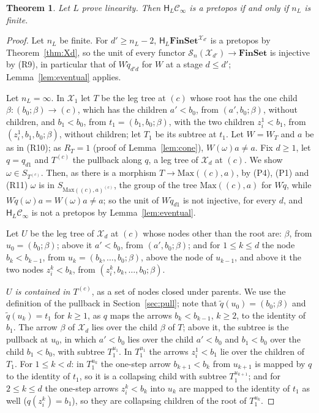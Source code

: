 \documentclass[11pt]{amsart}
\newtheorem{thm}{Theorem}[section]
\theoremstyle{definition}
\newcommand{\Fin}{\mathbf{FinSet}}
\newcommand{\Max}{\mathrm{Max}}
\newcommand{\HH}{\mathsf H}
\newcommand{\cX}{\mathcal X}
\newcommand{\cC}{\mathcal C}
\newcommand{\cS}{\mathcal S}
\begin{document}
\begin{thm}\label{thm:tower}
Let $L$ prove linearity. Then $\HH_L\cC_\infty$ is a pretopos if and
only if $n_L$ is finite.
\end{thm}
\begin{proof}
Let $n_L$ be finite. For $d'\ge n_L-2$, $\HH_L\Fin^{\cX_{d'}}$ is a
pretopos by Theorem~\ref{thm:Xd}, so the unit of every functor
$\cS_n(\cX_{d'})\to\Fin$ is injective by (R9), in particular that of
$W\tilde q_{d'd}$ for $W$ at a stage $d\le d'$;
Lemma~\ref{lem:eventual} applies.

Let $n_L=\infty$. In $\cX_1$ let $T$ be the leg tree at $(c)$ whose
root has the one child $\beta\colon(b_0;\beta)\to(c)$, which has the
children $a'<b_0$, from $(a',b_0;\beta)$, without children, and
$b_1<b_0$, from $t_1=(b_1,b_0;\beta)$, with the two children
$z^1_i<b_1$, from $(z^1_i,b_1,b_0;\beta)$, without children; let $T_1$
be its subtree at $t_1$. Let $W=W_T$ and $a$ be as in (R10); as
$R_T=1$ (proof of Lemma~\ref{lem:cone}), $W(\omega)a\ne a$. Fix
$d\ge1$, let $q=q_{d1}$ and $T^{(c)}$ the pullback along $q$, a leg
tree of $\cX_d$ at $(c)$. We show $\omega\in S_{T^{(c)}}$. Then, as
there is a morphism $T\to\Max((c),a)$, by (P4), (P1) and (R11)
$\omega$ is in $S_{\Max((c),a)^{(c)}}$, the group of the tree
$\Max((c),a)$ for $W\tilde q$, while $W\tilde
q(\omega)a=W(\omega)a\ne a$; so the unit of $W\tilde q_{d1}$ is not
injective, for every $d$, and $\HH_L\cC_\infty$ is not a pretopos by
Lemma~\ref{lem:eventual}.

Let $U$ be the leg tree of $\cX_d$ at $(c)$ whose nodes other than the
root are: $\beta$, from $u_0=(b_0;\beta)$; above it $a'<b_0$, from
$(a',b_0;\beta)$; and for $1\le k\le d$ the node $b_k<b_{k-1}$, from
$u_k=(b_k,\dots,b_0;\beta)$, above the node of $u_{k-1}$, and above it
the two nodes $z^k_i<b_k$, from $(z^k_i,b_k,\dots,b_0;\beta)$.

\emph{$U$ is contained in $T^{(c)}$}, as a set of nodes closed under
parents. We use the definition of the pullback in
Section~\ref{sec:pull}; note that $\tilde q(u_0)=(b_0;\beta)$ and
$\tilde q(u_k)=t_1$ for $k\ge1$, as $q$ maps the arrows $b_k<b_{k-1}$,
$k\ge2$, to the identity of $b_1$. The arrow $\beta$ of $\cX_d$ lies
over the child $\beta$ of $T$; above it, the subtree is the pullback
at $u_0$, in which $a'<b_0$ lies over the child $a'<b_0$ and $b_1<b_0$
over the child $b_1<b_0$, with subtree $T_1^{u_1}$. In $T_1^{u_1}$ the
arrows $z^1_i<b_1$ lie over the children of $T_1$. For $1\le k<d$: in
$T_1^{u_k}$ the one-step arrow $b_{k+1}<b_k$ from $u_{k+1}$ is mapped
by $q$ to the identity of $t_1$, so it is a collapsing child with
subtree $T_1^{u_{k+1}}$; and for $2\le k\le d$ the one-step arrows
$z^k_i<b_k$ into $u_k$ are mapped to the identity of $t_1$ as well
($q(z^k_i)=b_1$), so they are collapsing children of the root of
$T_1^{u_k}$.


\end{proof}
\end{document}
